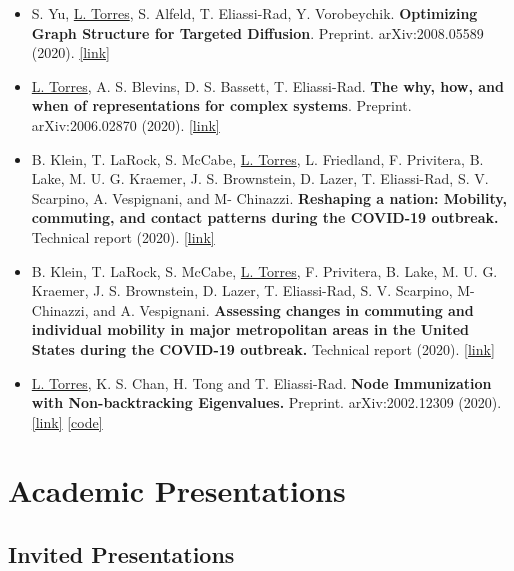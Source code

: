 \documentclass[12pt,]{scrartcl}
\newenvironment{myitemize}
{ \begin{itemize}
    \setlength{\itemsep}{5pt}
    \setlength{\parskip}{0pt}
    \setlength{\parsep}{0pt}     }
{ \end{itemize}                  }
\begin{document}
\begin{myitemize}
\leftskip-0.25in %

\item S. Yu, \underline{L. Torres}, S. Alfeld, T. Eliassi-Rad, Y. Vorobeychik. \textbf{Optimizing Graph Structure for Targeted Diffusion}. Preprint. 
arXiv:2008.05589 (2020). \href{https://arxiv.org/abs/2008.05589}{[link]}

\item \underline{L. Torres}, A. S. Blevins, D. S. Bassett, T. Eliassi-Rad. \textbf{The why, how, and when of representations for complex systems}. Preprint. arXiv:2006.02870 (2020). \href{https://arxiv.org/abs/2006.02870}{[link]}

\item B. Klein, T. LaRock, S. McCabe, \underline{L. Torres}, L. Friedland,
  F. Privitera, B. Lake, M. U. G. Kraemer, J. S. Brownstein, D. Lazer,
  T. Eliassi-Rad, S. V. Scarpino, A. Vespignani, and M-
  Chinazzi. \textbf{Reshaping a nation: Mobility, commuting, and contact
    patterns during the COVID-19 outbreak.} Technical report
  (2020). \href{https://www.mobs-lab.org/uploads/6/7/8/7/6787877/covid19mobility_report2.pdf}{[link]}

\item B. Klein, T. LaRock, S. McCabe, \underline{L. Torres}, F. Privitera, B. Lake, M. U. G. Kraemer, J. S. Brownstein, D. Lazer, T. Eliassi-Rad, S. V. Scarpino, M- Chinazzi, and A. Vespignani. \textbf{Assessing changes in commuting and individual mobility in major metropolitan areas in the United States during the COVID-19 outbreak.} Technical report (2020). \href{https://www.mobs-lab.org/uploads/6/7/8/7/6787877/assessing_mobility_changes_in_the_united_states_during_the_covid_19_outbreak.pdf}{[link]}

\item \underline{L. Torres}, K. S. Chan, H. Tong and T. Eliassi-Rad. \textbf{Node Immunization with Non-backtracking Eigenvalues.} Preprint. arXiv:2002.12309 (2020). \href{https://arxiv.org/abs/2002.12309}{[link]} \href{https://github.com/leotrs/inbox}{[code]}

\end{myitemize}


\section{Academic Presentations}\label{presentations}

\subsection{Invited Presentations}\label{invited-presentations}
\end{document}

